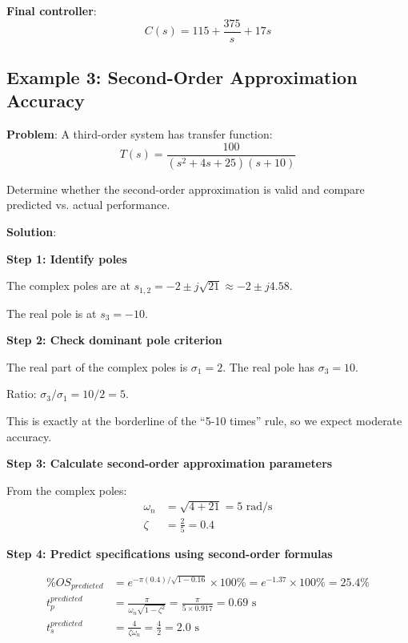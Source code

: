 \textbf{Final controller}:
\begin{equation}
    \boxed{C(s) = 115 + \frac{375}{s} + 17s}
\end{equation}

\subsection{Example 3: Second-Order Approximation Accuracy}

\textbf{Problem}: A third-order system has transfer function:
\begin{equation}
    T(s) = \frac{100}{(s^2 + 4s + 25)(s + 10)}
\end{equation}

Determine whether the second-order approximation is valid and compare predicted vs. actual performance.

\textbf{Solution}:

\textbf{Step 1: Identify poles}

The complex poles are at $s_{1,2} = -2 \pm j\sqrt{21} \approx -2 \pm j4.58$.

The real pole is at $s_3 = -10$.

\textbf{Step 2: Check dominant pole criterion}

The real part of the complex poles is $\sigma_1 = 2$.
The real pole has $\sigma_3 = 10$.

Ratio: $\sigma_3/\sigma_1 = 10/2 = 5$.

This is exactly at the borderline of the ``5-10 times'' rule, so we expect moderate accuracy.

\textbf{Step 3: Calculate second-order approximation parameters}

From the complex poles:
\begin{align}
    \omega_n &= \sqrt{4 + 21} = 5 \text{ rad/s} \\
    \zeta &= \frac{2}{5} = 0.4
\end{align}

\textbf{Step 4: Predict specifications using second-order formulas}

\begin{align}
    \%OS_{predicted} &= e^{-\pi(0.4)/\sqrt{1-0.16}} \times 100\% = e^{-1.37} \times 100\% = 25.4\% \\
    t_p^{predicted} &= \frac{\pi}{\omega_n\sqrt{1-\zeta^2}} = \frac{\pi}{5 \times 0.917} = 0.69 \text{ s} \\
    t_s^{predicted} &= \frac{4}{\zeta\omega_n} = \frac{4}{2} = 2.0 \text{ s}
\end{align}

